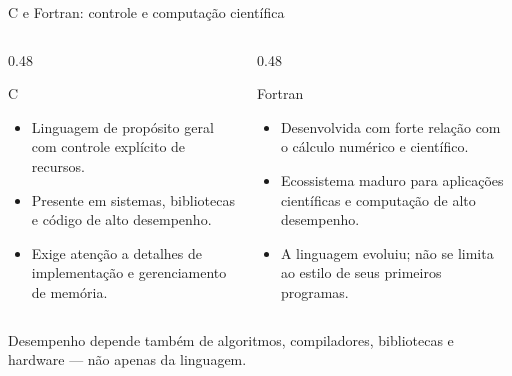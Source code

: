 \documentclass[aspectratio=169,10pt]{beamer}
\begin{document}
\begin{frame}{C e Fortran: controle e computação científica}
  \begin{columns}[T,onlytextwidth]
    \begin{column}{0.48\textwidth}
      \begin{block}{C}
        \begin{itemize}
          \item Linguagem de propósito geral com controle explícito de recursos.
          \item Presente em sistemas, bibliotecas e código de alto desempenho.
          \item Exige atenção a detalhes de implementação e gerenciamento de memória.
        \end{itemize}
      \end{block}
    \end{column}
    \begin{column}{0.48\textwidth}
      \begin{exampleblock}{Fortran}
        \begin{itemize}
          \item Desenvolvida com forte relação com o cálculo numérico e científico.
          \item Ecossistema maduro para aplicações científicas e computação de alto desempenho.
          \item A linguagem evoluiu; não se limita ao estilo de seus primeiros programas.
        \end{itemize}
      \end{exampleblock}
    \end{column}
  \end{columns}
  \vspace{0.3em}
  \centering\small Desempenho depende também de algoritmos, compiladores, bibliotecas e hardware — não apenas da linguagem.
\end{frame}
\end{document}
